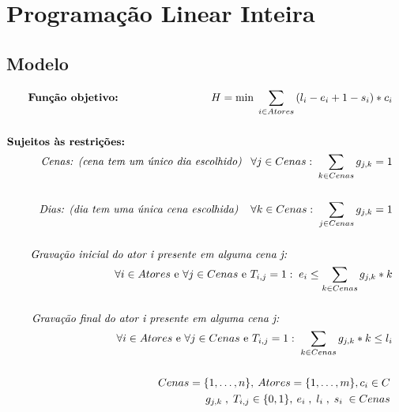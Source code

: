 \section{Programação Linear Inteira}
% 
% 
\subsection{Modelo}
\begin{align}
    \textbf{Função objetivo:}\hspace*{3cm} 
	H =\text{min}\; \displaystyle\sum_{i\in Atores} {(l_i - e_i+1- s_i)*c_i}\\\nonumber\\ \nonumber  
 	\textbf{Sujeitos às restrições:}\hspace*{8,65cm} \nonumber \\
 \textit{Cenas: (cena tem um único dia escolhido)}\hspace*{0,295cm} \forall j \in Cenas: \;\displaystyle\sum_{k \in Cenas} {g_{j,k} = 1}  \\\nonumber \\  \textit{Dias: (dia tem uma única cena escolhida) }\hspace*{0,275cm} \forall k \in Cenas: \;\displaystyle\sum_{j \in Cenas} {g_{j,k} = 1}  \\\nonumber \\
\textit{Gravação inicial do ator i presente em alguma cena j: }\hspace*{3,25cm}\nonumber \\
\forall i \in Atores\text{ e }\forall  j\in Cenas \text{ e } T_{i,j} = 1:\; e_i \leq \displaystyle\sum_{k \in Cenas} {g_{j,k}*k}   \\\nonumber \\ 
\textit{Gravação final do ator i presente em alguma cena j: }\hspace*{3,50cm}\nonumber \\
\forall i \in Atores\text{ e }\forall  j\in Cenas \text{ e } T_{i,j} = 1:\; \displaystyle\sum_{k \in Cenas} {g_{j,k}*k}  \leq l_i &  \\\nonumber\\   \nonumber    
Cenas = \{1, \dots ,n\} ,\:
Atores = \{1, \dots ,m\} ,c_i \in C\:
\nonumber \\
g_{j,k}\;,\; T_{i,j} \in \{0,1\},\:e_i \;,\; l_i\;,\; s_i \;\in Cenas \nonumber  \:
\nonumber \\ \nonumber
\end{align}
